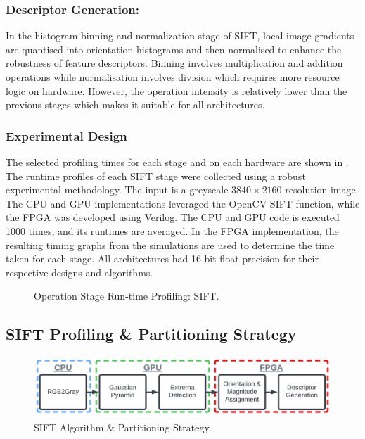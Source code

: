 \subsubsection{Descriptor Generation:}
In the histogram binning and normalization stage of SIFT, local image gradients are quantised into orientation histograms and then normalised to enhance the robustness of feature descriptors. Binning  involves multiplication and addition operations while normalisation involves division which requires more resource logic on hardware. However, the operation intensity is relatively lower than the previous stages which makes it suitable for all architectures.

\subsubsection*{Experimental Design}
The selected profiling times for each stage and on each hardware are shown in . The runtime profiles of each SIFT stage were collected using a robust experimental methodology. The input is a greyscale $3840 \times 2160$ resolution image. The CPU and GPU implementations leveraged the OpenCV SIFT function, while the FPGA was developed using Verilog. The CPU and GPU code is executed 1000 times, and its runtimes are averaged. In the FPGA implementation, the resulting timing graphs from the simulations are used to determine the time taken for each stage. All architectures had 16-bit float precision for their respective designs and algorithms.


\begin{figure}[t]
    \centering
\resizebox{\columnwidth}{!}{}    
    \caption{{Operation Stage Run-time Profiling: SIFT.}}
    \label{fig:SIFTAlgoProfiling}
\end{figure}

\subsection{SIFT Profiling \& Partitioning Strategy}

\begin{figure}[t]
\centering
  \includegraphics[width=\columnwidth]{Images/SIFT Partition.png}
    \caption{SIFT Algorithm \& Partitioning Strategy.}
    \label{fig:Partitioning}
\end{figure}


